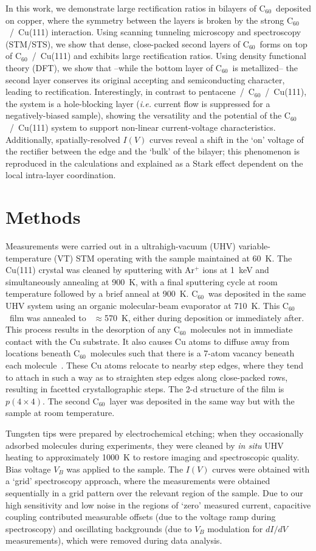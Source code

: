 \documentclass[11pt,showpacs,amsmath,amssymbl]{revtex4}
\newcommand{\buck}{C$_{60}$~}
\begin{document}
In this work, we demonstrate large rectification ratios in bilayers of \buck deposited on copper, where the symmetry between the layers is broken by the strong  \buck/~Cu(111) interaction. Using scanning tunneling microscopy and spectroscopy (STM/STS), we show that dense, close-packed second layers of \buck forms on top of  \buck/~Cu(111) and exhibits large rectification ratios. Using density functional theory (DFT), we show that --while the bottom layer of \buck is metallized-- the second layer conserves its original accepting and semiconducting character, leading to rectification. Interestingly, in contrast to pentacene~/~\buck/~Cu(111), the system is a hole-blocking layer ({\it i.e.} current flow is suppressed for a negatively-biased sample), showing the versatility and the potential of the \buck/~Cu(111) system to support non-linear current-voltage characteristics.  
Additionally, spatially-resolved $I(V)$ curves reveal a shift in the `on' voltage of the rectifier between the edge and the `bulk' of the bilayer; this phenomenon is reproduced in the calculations and explained as a Stark effect dependent on the local intra-layer coordination. 



\section{Methods}
 Measurements were carried out in a ultrahigh-vacuum (UHV) variable-temperature (VT) STM operating with the sample maintained at 60~K.  The Cu(111) crystal was cleaned by sputtering with Ar$^+$ ions at 1~keV and simultaneously annealing at 900~K, with a final sputtering cycle at room temperature followed by a brief anneal at 900~K. \buck was deposited in the same UHV system using an organic molecular-beam evaporator at  710~K.  This \buck film was annealed to ~$\approx$570~K, either during deposition or immediately after. This process results in the desorption of any \buck molecules not in immediate contact with the Cu substrate.  It also causes Cu atoms to diffuse away from locations beneath \buck molecules such that there is a 7-atom vacancy beneath each molecule~\cite{Pai:2004bc}.  These Cu atoms relocate to nearby step edges, where they tend to attach in such a way as to straighten step edges along close-packed rows, resulting in facetted crystallographic steps. The 2-d structure of the film is $p(4\times4)$. The second \buck layer was deposited in the same way but with the sample at room temperature.

Tungsten tips were prepared by electrochemical etching; when they occasionally adsorbed molecules during experiments, they were cleaned by {\it in situ} UHV heating to approximately 1000~K to restore imaging and spectroscopic quality.  Bias voltage $V_B$ was applied to the sample.  The $I(V)$  curves were obtained with a `grid' spectroscopy approach, where the measurements were obtained sequentially in a grid pattern over the relevant region of the sample.  Due to our high sensitivity and low noise in the regions of `zero' measured current, capacitive coupling contributed measurable offsets (due to the voltage ramp during spectroscopy) and oscillating backgrounds (due to $V_B$ modulation for $dI/dV$ measurements), which were removed during data analysis.
\end{document}
